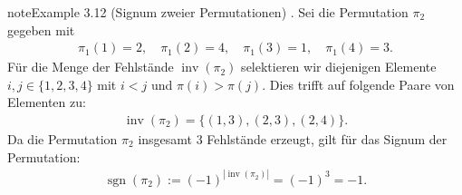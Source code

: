 \documentclass[letterpaper,10pt,english]{jupyterBook}
\begin{document}
\begin{sphinxadmonition}{note}{Example 3.12 (Signum zweier Permutationen)}
. Sei die Permutation \(\pi_2\) gegeben mit
\begin{equation*}
\begin{split}\pi_1(1) = 2, \quad \pi_1(2) = 4, \quad \pi_1(3) = 1, \quad \pi_1(4) = 3.\end{split}
\end{equation*}
\sphinxAtStartPar
Für die Menge der Fehlstände \(\operatorname{inv}(\pi_2)\) selektieren wir diejenigen Elemente \(i,j \in \lbrace 1,2,3,4 \rbrace\) mit \(i < j\) und \(\pi(i) > \pi(j)\).
Dies trifft auf folgende Paare von Elementen zu:
\begin{equation*}
\begin{split}\operatorname{inv}(\pi_2) = \lbrace (1,3), (2,3), (2,4)\rbrace.\end{split}
\end{equation*}
\sphinxAtStartPar
Da die Permutation \(\pi_2\) insgesamt \(3\) Fehlstände erzeugt, gilt für das Signum der Permutation:
\begin{equation*}
\begin{split}\operatorname{sgn}(\pi_2) := (-1)^{|\operatorname{inv}(\pi_2)|} = (-1)^3 = -1.\end{split}
\end{equation*}\end{sphinxadmonition}
\end{document}
